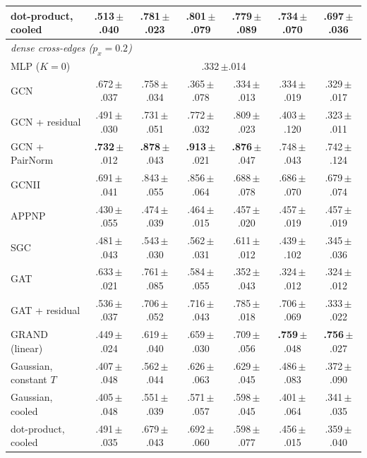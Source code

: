 \begin{tabular}{lcccccc}
dot-product, cooled & .513\,{\tiny$\pm$.040} & .781\,{\tiny$\pm$.023} & .801\,{\tiny$\pm$.079} & .779\,{\tiny$\pm$.089} & .734\,{\tiny$\pm$.070} & .697\,{\tiny$\pm$.036}\\
\midrule
\multicolumn{7}{l}{\emph{dense cross-edges ($p_x=0.2$)}}\\
MLP ($K=0$) & \multicolumn{6}{c}{.332\,{\tiny$\pm$.014}}\\
GCN & .672\,{\tiny$\pm$.037} & .758\,{\tiny$\pm$.034} & .365\,{\tiny$\pm$.078} & .334\,{\tiny$\pm$.013} & .334\,{\tiny$\pm$.019} & .329\,{\tiny$\pm$.017}\\
GCN + residual & .491\,{\tiny$\pm$.030} & .731\,{\tiny$\pm$.051} & .772\,{\tiny$\pm$.032} & .809\,{\tiny$\pm$.023} & .403\,{\tiny$\pm$.120} & .323\,{\tiny$\pm$.011}\\
GCN + PairNorm & \textbf{.732}\,{\tiny$\pm$.012} & \textbf{.878}\,{\tiny$\pm$.043} & \textbf{.913}\,{\tiny$\pm$.021} & \textbf{.876}\,{\tiny$\pm$.047} & .748\,{\tiny$\pm$.043} & .742\,{\tiny$\pm$.124}\\
GCNII & .691\,{\tiny$\pm$.041} & .843\,{\tiny$\pm$.055} & .856\,{\tiny$\pm$.064} & .688\,{\tiny$\pm$.078} & .686\,{\tiny$\pm$.070} & .679\,{\tiny$\pm$.074}\\
APPNP & .430\,{\tiny$\pm$.055} & .474\,{\tiny$\pm$.039} & .464\,{\tiny$\pm$.015} & .457\,{\tiny$\pm$.020} & .457\,{\tiny$\pm$.019} & .457\,{\tiny$\pm$.019}\\
SGC & .481\,{\tiny$\pm$.043} & .543\,{\tiny$\pm$.030} & .562\,{\tiny$\pm$.031} & .611\,{\tiny$\pm$.012} & .439\,{\tiny$\pm$.102} & .345\,{\tiny$\pm$.036}\\
GAT & .633\,{\tiny$\pm$.021} & .761\,{\tiny$\pm$.085} & .584\,{\tiny$\pm$.055} & .352\,{\tiny$\pm$.043} & .324\,{\tiny$\pm$.012} & .324\,{\tiny$\pm$.012}\\
GAT + residual & .536\,{\tiny$\pm$.037} & .706\,{\tiny$\pm$.052} & .716\,{\tiny$\pm$.043} & .785\,{\tiny$\pm$.018} & .706\,{\tiny$\pm$.069} & .333\,{\tiny$\pm$.022}\\
GRAND (linear) & .449\,{\tiny$\pm$.024} & .619\,{\tiny$\pm$.040} & .659\,{\tiny$\pm$.030} & .709\,{\tiny$\pm$.056} & \textbf{.759}\,{\tiny$\pm$.048} & \textbf{.756}\,{\tiny$\pm$.027}\\
Gaussian, constant $T$ & .407\,{\tiny$\pm$.048} & .562\,{\tiny$\pm$.044} & .626\,{\tiny$\pm$.063} & .629\,{\tiny$\pm$.045} & .486\,{\tiny$\pm$.083} & .372\,{\tiny$\pm$.090}\\
Gaussian, cooled & .405\,{\tiny$\pm$.048} & .551\,{\tiny$\pm$.039} & .571\,{\tiny$\pm$.057} & .598\,{\tiny$\pm$.045} & .401\,{\tiny$\pm$.064} & .341\,{\tiny$\pm$.035}\\
dot-product, cooled & .491\,{\tiny$\pm$.035} & .679\,{\tiny$\pm$.043} & .692\,{\tiny$\pm$.060} & .598\,{\tiny$\pm$.077} & .456\,{\tiny$\pm$.015} & .359\,{\tiny$\pm$.040}\\
\bottomrule
\end{tabular}
